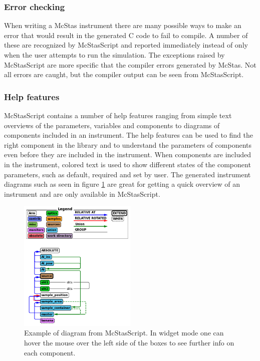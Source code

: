 \documentclass[11pt, a4paper]{article}
\begin{document}
\subsubsection{Error checking}
When writing a McStas instrument there are many possible ways to make an error that would result in the generated C code to fail to compile. A number of these are recognized by McStasScript and reported immediately instead of only when the user attempts to run the simulation. The exceptions raised by McStasScript are more specific that the compiler errors generated by McStas. Not all errors are caught, but the compiler output can be seen from McStasScript.

\subsubsection{Help features}
McStasScript contains a number of help features ranging from simple text overviews of the parameters, variables and components to diagrams of components included in an instrument. The help features can be used to find the right component in the library and to understand the parameters of components even before they are included in the instrument. When components are included in the instrument, colored text is used to show different states of the component parameters, such as default, required and set by user. The generated instrument diagrams such as seen in figure \ref{fig:diagram} are great for getting a quick overview of an instrument and are only available in McStasScript.

\begin{figure}[h!!!]
\centering
\includegraphics[width=0.5\textwidth]{figures/diagram_example.png}
\caption{\label{fig:diagram}Example of diagram from McStasScript. In widget mode one can hover the mouse over the left side of the boxes to see further info on each component.}
\end{figure}
\end{document}
